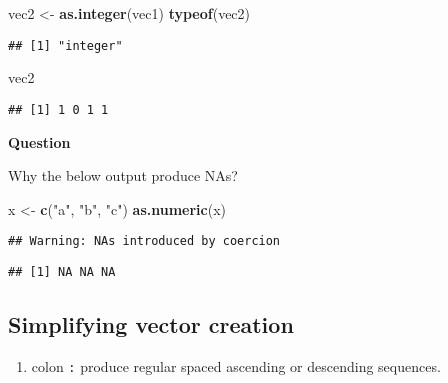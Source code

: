\documentclass[]{book}
\newenvironment{Shaded}{\begin{snugshade}}{\end{snugshade}}
\newcommand{\KeywordTok}[1]{\textcolor[rgb]{0.13,0.29,0.53}{\textbf{#1}}}
\newcommand{\NormalTok}[1]{#1}
\newcommand{\StringTok}[1]{\textcolor[rgb]{0.31,0.60,0.02}{#1}}
\providecommand{\tightlist}{%
  \setlength{\itemsep}{0pt}\setlength{\parskip}{0pt}}
\begin{document}
\begin{Shaded}
\begin{Highlighting}[]
\NormalTok{vec2 <-}\StringTok{ }\KeywordTok{as.integer}\NormalTok{(vec1)}
\KeywordTok{typeof}\NormalTok{(vec2)}
\end{Highlighting}
\end{Shaded}

\begin{verbatim}
## [1] "integer"
\end{verbatim}

\begin{Shaded}
\begin{Highlighting}[]
\NormalTok{vec2}
\end{Highlighting}
\end{Shaded}

\begin{verbatim}
## [1] 1 0 1 1
\end{verbatim}

\textbf{Question}

Why the below output produce NAs?

\begin{Shaded}
\begin{Highlighting}[]
\NormalTok{x <-}\StringTok{ }\KeywordTok{c}\NormalTok{(}\StringTok{"a"}\NormalTok{, }\StringTok{"b"}\NormalTok{, }\StringTok{"c"}\NormalTok{)}
\KeywordTok{as.numeric}\NormalTok{(x)}
\end{Highlighting}
\end{Shaded}

\begin{verbatim}
## Warning: NAs introduced by coercion
\end{verbatim}

\begin{verbatim}
## [1] NA NA NA
\end{verbatim}

\hypertarget{simplifying-vector-creation}{%
\subsection{Simplifying vector creation}\label{simplifying-vector-creation}}

\begin{enumerate}
\def\labelenumi{\arabic{enumi}.}
\tightlist
\item
  colon \texttt{:} produce regular spaced ascending or descending sequences.
\end{enumerate}
\end{document}
